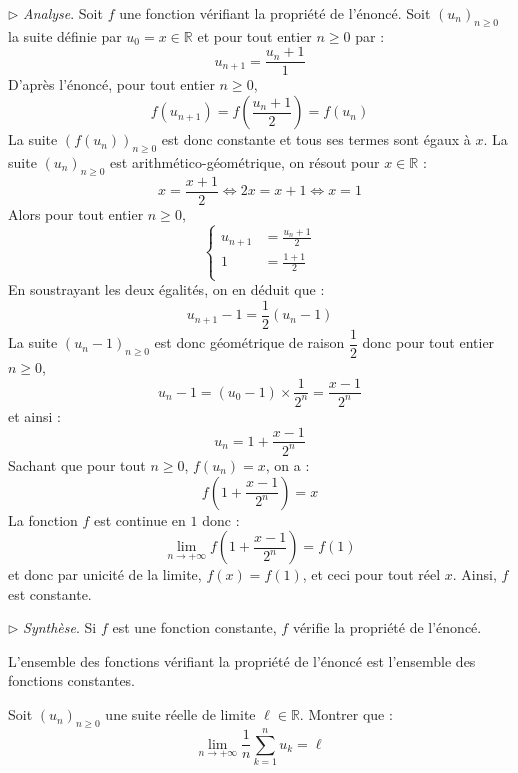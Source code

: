 \documentclass[a4paper,10pt]{report}
\begin{document}
$\rhd$ \textit{Analyse}. Soit $f$ une fonction vérifiant la propriété de l'énoncé. Soit $(u_n)_{n \geq 0}$ la suite définie par $u_0=x \in \mathbb{R}$ et pour tout entier $n \geq 0$ par :
$$ u_{n+1} = \dfrac{u_n+1}{1}$$
D'après l'énoncé, pour tout entier $n \geq 0$,
$$ f(u_{n+1}) = f \left( \frac{u_n+1}{2} \right) = f(u_n)$$
La suite $(f(u_n))_{n \geq 0}$ est donc constante et tous ses termes sont égaux à $x$. La suite $(u_n)_{n \geq 0}$ est arithmético-géométrique, on résout pour $x \in \mathbb{R}$ : 
$$ x = \dfrac{x+1}{2} \Longleftrightarrow 2x=x+1 \Longleftrightarrow x=1$$
Alors pour tout entier $n \geq 0$,
$$ \left\lbrace \begin{array}{ccl}
u_{n+1} & =  \frac{u_n+1}{2}  \\[0.1cm]
1 & =  \frac{1+1}{2}  \\
\end{array}\right.$$
En soustrayant les deux égalités, on en déduit que :
$$u_{n+1}-1 = \dfrac{1}{2} (u_n-1)$$
La suite $(u_n-1)_{n \geq 0}$ est donc géométrique de raison $\dfrac{1}{2}$ donc pour tout entier $n \geq 0$,
$$ u_n - 1 = (u_0-1) \times \dfrac{1}{2^n} = \dfrac{x-1}{2^n}$$
et ainsi :
$$ u_n = 1 +  \dfrac{x-1}{2^n}$$
Sachant que pour tout $n \geq 0$, $f(u_n)=x$, on a :
$$ f \left( 1 +  \dfrac{x-1}{2^n} \right) = x$$
La fonction $f$ est continue en $1$ donc :
$$ \lim_{n \rightarrow + \infty}f \left( 1 +  \dfrac{x-1}{2^n} \right) = f(1)$$
et donc par unicité de la limite, $f(x)=f(1)$, et ceci pour tout réel $x$. Ainsi, $f$ est constante.

\medskip

\noindent $\rhd$ \textit{Synthèse}. Si $f$ est une fonction constante, $f$ vérifie la propriété de l'énoncé.

\medskip

\noindent L'ensemble des fonctions vérifiant la propriété de l'énoncé est l'ensemble des fonctions constantes.





\medskip

\begin{Exa} Soit $(u_n)_{n \geq 0}$ une suite réelle de limite $\ell \in \mathbb{R}$. Montrer que :
$$ \lim_{n \rightarrow + \infty} \frac{1}{n} \sum_{k=1}^n u_k = \ell$$
\end{Exa}
\end{document}

